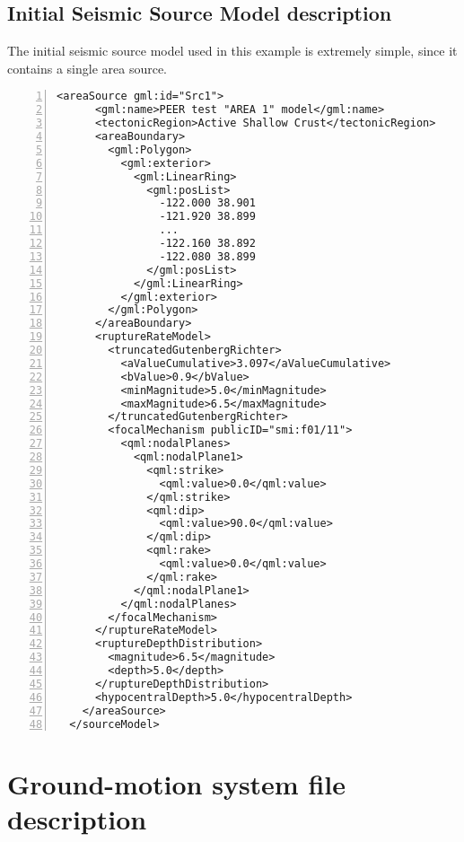 %
\subsection{Initial Seismic Source Model description}
The initial seismic source model used in this example is extremely simple, 
since it contains a single area source. 
%
\begin{Verbatim}[baselinestretch=1,fontsize=\small,numbers=left,frame=single]
    <areaSource gml:id="Src1">
      <gml:name>PEER test "AREA 1" model</gml:name>
      <tectonicRegion>Active Shallow Crust</tectonicRegion>
      <areaBoundary>
        <gml:Polygon>
          <gml:exterior>
            <gml:LinearRing>
              <gml:posList>
				-122.000 38.901 
				-121.920 38.899 
				...
				-122.160 38.892 
				-122.080 38.899 
			  </gml:posList>
            </gml:LinearRing>
          </gml:exterior>
        </gml:Polygon>
      </areaBoundary>
      <ruptureRateModel>
        <truncatedGutenbergRichter>
          <aValueCumulative>3.097</aValueCumulative>
          <bValue>0.9</bValue>
          <minMagnitude>5.0</minMagnitude>
          <maxMagnitude>6.5</maxMagnitude>
        </truncatedGutenbergRichter>
        <focalMechanism publicID="smi:f01/11">
          <qml:nodalPlanes>
            <qml:nodalPlane1>
              <qml:strike>
                <qml:value>0.0</qml:value>
              </qml:strike>
              <qml:dip>
                <qml:value>90.0</qml:value>
              </qml:dip>
              <qml:rake>
                <qml:value>0.0</qml:value>
              </qml:rake>
            </qml:nodalPlane1>
          </qml:nodalPlanes>
        </focalMechanism>
      </ruptureRateModel>
      <ruptureDepthDistribution>
        <magnitude>6.5</magnitude>
        <depth>5.0</depth>
      </ruptureDepthDistribution>
      <hypocentralDepth>5.0</hypocentralDepth>
    </areaSource>
  </sourceModel>
\end{Verbatim}


%
\section{Ground-motion system file description}